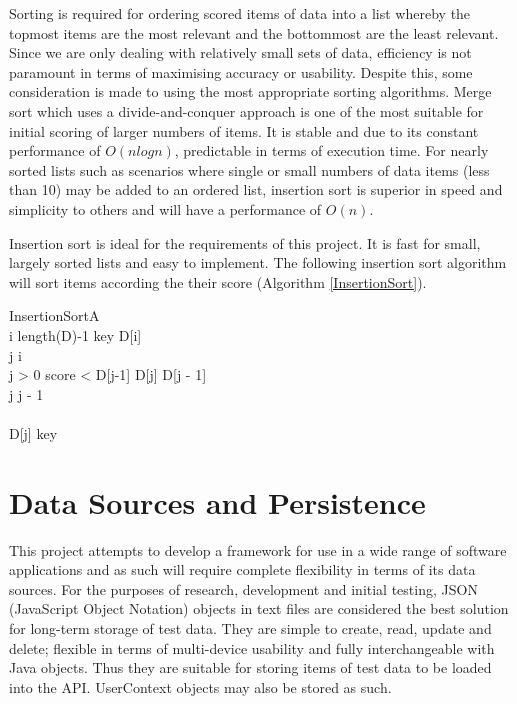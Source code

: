 Sorting is required for ordering scored items of data into a list whereby the topmost items are the most relevant and the bottommost are the least relevant. Since we are only dealing with relatively small sets of data, efficiency is not paramount in terms of maximising accuracy or usability. Despite this, some consideration is made to using the most appropriate sorting algorithms. 
Merge sort which uses a divide-and-conquer approach is one of the most suitable for initial scoring of larger numbers of items. It is stable and due to its constant performance of $O(nlogn)$, predictable in terms of execution time. 
For nearly sorted lists such as scenarios where single or small numbers of data items (less than 10) may be added to an ordered list, insertion sort is superior in speed and simplicity to others and will have a performance of $O(n)$.

Insertion sort is ideal for the requirements of this project. It is fast for small, largely sorted lists and easy to implement. The following insertion sort algorithm will sort items according the their score (Algorithm \ref{InsertionSort}).

\begin{pseudocode}{InsertionSort}{A}
	\label{InsertionSort}
	\\
	\FOR i \TO length(D)-1 \DO
	\BEGIN
		key \GETS D[i]\\
		j \GETS i\\
		\WHILE j > 0 \AND score < D[j-1] \DO
		\BEGIN
			D[j] \GETS D[j - 1]\\
			j \GETS j - 1\\
		\END \\
		D[j] \GETS key \\
	\END	
		
\end{pseudocode}

\section{Data Sources and Persistence}

This project attempts to develop a framework for use in a wide range of software applications and as such will require complete flexibility in terms of its data sources. For the purposes of research, development and initial testing, JSON (JavaScript Object Notation) objects in text files are considered the best solution for long-term storage of test data. They are simple to create, read, update and delete; flexible in terms of multi-device usability and fully interchangeable with Java objects. Thus they are suitable for storing items of test data to be loaded into the API. UserContext objects may also be stored as such.

